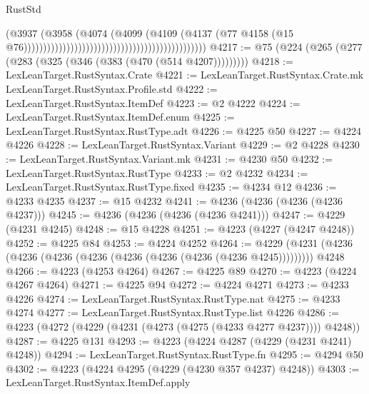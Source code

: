 \begin{lexlean}{RustStd}
\begin{coremodule}
                                                                                  (@3937
                                                                                    (@3958
                                                                                      (@4074
                                                                                        (@4099
                                                                                          (@4109
                                                                                            (@4137
                                                                                              (@77
                                                                                                @4158
                                                                                                (@15
                                                                                                  @76)))))))))))))))))))))))))))))))))))))))))))))))
@4217 := @75 (@224 (@265 (@277 (@283 (@325 (@346 (@383 (@470 (@514 @4207)))))))))
@4218 := LexLeanTarget.RustSyntax.Crate
@4221 := LexLeanTarget.RustSyntax.Crate.mk LexLeanTarget.RustSyntax.Profile.std
@4222 := LexLeanTarget.RustSyntax.ItemDef
@4223 := @2 @4222
@4224 := LexLeanTarget.RustSyntax.ItemDef.enum
@4225 := LexLeanTarget.RustSyntax.RustType.adt
@4226 := @4225 @50
@4227 := @4224 @4226
@4228 := LexLeanTarget.RustSyntax.Variant
@4229 := @2 @4228
@4230 := LexLeanTarget.RustSyntax.Variant.mk
@4231 := @4230 @50
@4232 := LexLeanTarget.RustSyntax.RustType
@4233 := @2 @4232
@4234 := LexLeanTarget.RustSyntax.RustType.fixed
@4235 := @4234 @12
@4236 := @4233 @4235
@4237 := @15 @4232
@4241 := @4236 (@4236 (@4236 (@4236 @4237)))
@4245 := @4236 (@4236 (@4236 (@4236 @4241)))
@4247 := @4229 (@4231 @4245)
@4248 := @15 @4228
@4251 := @4223 (@4227 (@4247 @4248))
@4252 := @4225 @84
@4253 := @4224 @4252
@4264 := @4229 (@4231 (@4236 (@4236 (@4236 (@4236 (@4236 (@4236 (@4236 (@4236 @4245))))))))) @4248
@4266 := @4223 (@4253 @4264)
@4267 := @4225 @89
@4270 := @4223 (@4224 @4267 @4264)
@4271 := @4225 @94
@4272 := @4224 @4271
@4273 := @4233 @4226
@4274 := LexLeanTarget.RustSyntax.RustType.nat
@4275 := @4233 @4274
@4277 := LexLeanTarget.RustSyntax.RustType.list @4226
@4286 := @4223 (@4272 (@4229 (@4231 (@4273 (@4275 (@4233 @4277 @4237)))) @4248))
@4287 := @4225 @131
@4293 := @4223 (@4224 @4287 (@4229 (@4231 @4241) @4248))
@4294 := LexLeanTarget.RustSyntax.RustType.fn
@4295 := @4294 @50
@4302 := @4223 (@4224 @4295 (@4229 (@4230 @357 @4237) @4248))
@4303 := LexLeanTarget.RustSyntax.ItemDef.apply

\end{coremodule}
\end{lexlean}

